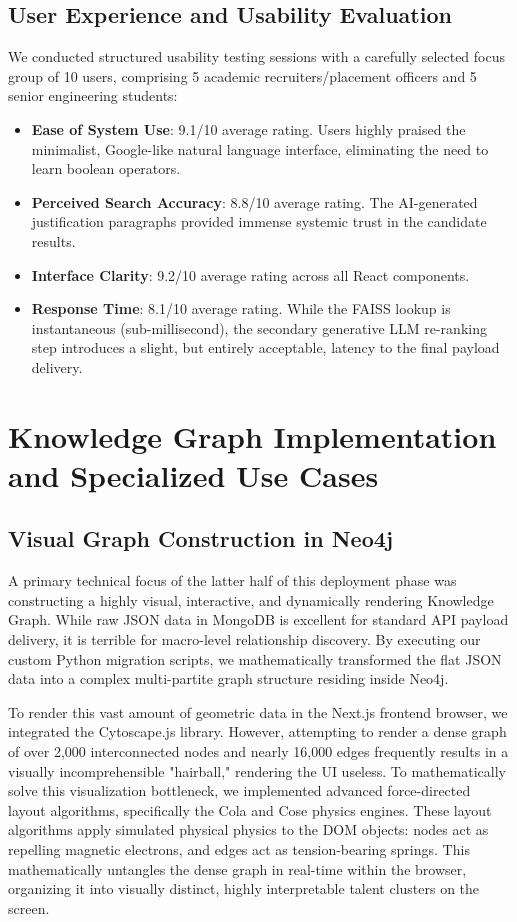 \documentclass[12pt,a4paper]{report}
\begin{document}
\section{User Experience and Usability Evaluation}

We conducted structured usability testing sessions with a carefully selected focus group of 10 users, comprising 5 academic recruiters/placement officers and 5 senior engineering students:

\begin{itemize}
    \item \textbf{Ease of System Use}: 9.1/10 average rating. Users highly praised the minimalist, Google-like natural language interface, eliminating the need to learn boolean operators.
    \item \textbf{Perceived Search Accuracy}: 8.8/10 average rating. The AI-generated justification paragraphs provided immense systemic trust in the candidate results.
    \item \textbf{Interface Clarity}: 9.2/10 average rating across all React components.
    \item \textbf{Response Time}: 8.1/10 average rating. While the FAISS lookup is instantaneous (sub-millisecond), the secondary generative LLM re-ranking step introduces a slight, but entirely acceptable, latency to the final payload delivery.
\end{itemize}

\chapter{Knowledge Graph Implementation and Specialized Use Cases}

\section{Visual Graph Construction in Neo4j}

A primary technical focus of the latter half of this deployment phase was constructing a highly visual, interactive, and dynamically rendering Knowledge Graph. While raw JSON data in MongoDB is excellent for standard API payload delivery, it is terrible for macro-level relationship discovery. By executing our custom Python migration scripts, we mathematically transformed the flat JSON data into a complex multi-partite graph structure residing inside Neo4j.

To render this vast amount of geometric data in the Next.js frontend browser, we integrated the Cytoscape.js library. However, attempting to render a dense graph of over 2,000 interconnected nodes and nearly 16,000 edges frequently results in a visually incomprehensible "hairball," rendering the UI useless. To mathematically solve this visualization bottleneck, we implemented advanced force-directed layout algorithms, specifically the Cola and Cose physics engines. These layout algorithms apply simulated physical physics to the DOM objects: nodes act as repelling magnetic electrons, and edges act as tension-bearing springs. This mathematically untangles the dense graph in real-time within the browser, organizing it into visually distinct, highly interpretable talent clusters on the screen.
\end{document}
